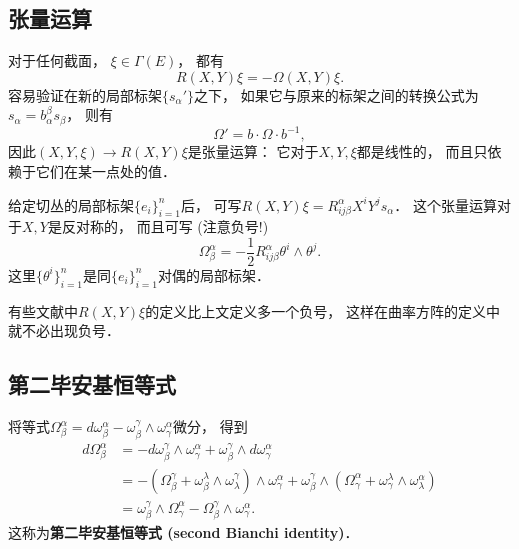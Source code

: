 \subsection{张量运算}
对于任何截面， $\xi\in\Gamma(E)$， 都有
$$
R(X,Y)\xi=-\Omega(X,Y)\xi.
$$
容易验证在新的局部标架$\{s_\alpha'\}$之下， 如果它与原来的标架之间的转换公式为$s_\alpha=b_\alpha^\beta s_\beta$， 则有
$$
\Omega'=b\cdot\Omega \cdot b^{-1},
$$
因此$(X,Y,\xi)\to R(X,Y)\xi$是张量运算： 它对于$X,Y,\xi$都是线性的， 而且只依赖于它们在某一点处的值． 

给定切丛的局部标架$\{e_i\}_{i=1}^n$后， 可写$R(X,Y)\xi=R^\alpha_{ij\beta}X^iY^js_\alpha$． 这个张量运算对于$X,Y$是反对称的， 而且可写 (注意负号!)
$$
\Omega_\beta^\alpha=-\frac{1}{2}R^\alpha_{ij\beta}\theta^i\wedge\theta^j.
$$
这里$\{\theta^i\}_{i=1}^n$是同$\{e_i\}_{i=1}^n$对偶的局部标架．

有些文献中$R(X,Y)\xi$的定义比上文定义多一个负号， 这样在曲率方阵的定义中就不必出现负号．

\subsection{第二毕安基恒等式}
将等式$\Omega_\beta^\alpha=d\omega_\beta^\alpha-\omega_\beta^\gamma\wedge\omega_\gamma^\alpha$微分， 得到
$$
\begin{aligned}
d\Omega_\beta^\alpha&=-d\omega_\beta^\gamma\wedge\omega_\gamma^\alpha+\omega_\beta^\gamma\wedge d\omega_\gamma^\alpha\\
&=-(\Omega_\beta^\gamma+\omega_\beta^\lambda\wedge\omega_\lambda^\gamma)\wedge\omega_\gamma^\alpha
+\omega_\beta^\gamma\wedge(\Omega_\gamma^\alpha+\omega_\gamma^\lambda\wedge\omega_\lambda^\alpha)\\
&=\omega_\beta^\gamma\wedge\Omega_\gamma^\alpha-\Omega_\beta^\gamma\wedge\omega_\gamma^\alpha.
\end{aligned}
$$
这称为\textbf{第二毕安基恒等式 (second Bianchi identity)}．